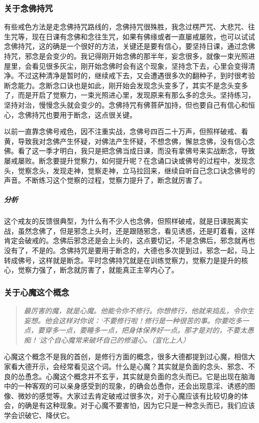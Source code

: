 \subsubsection{关于念佛持咒}

有些戒色方法是走念佛持咒路线的，念佛持咒很殊胜，我念过楞严咒、大悲咒、往生咒等，现在日课有念佛和念往生咒，如果有佛缘或者一直屡戒屡败，也可以试试念佛持咒，这的确是一个很好的方法，关键还是要有信心，要坚持日课，通过念佛持咒，邪念是会变少的。我记得刚开始念佛的那半年，妄念很多，就像一束光照进屋里，会看见很多灰尘，刚开始念佛时会有这个现象，坚持念下去，心里会变得清净。不过这种清净是暂时的，继续戒下去，又会遭遇很多次的翻种子，到时很考验断念能力。念断念口诀也是如此，刚开始会发现念头变多了，其实不是念头变多了，而是开启了觉察力，一束光照进心里，发现原来有那么多的念头。坚持练习，坚持对治，慢慢念头就会变少的。念佛持咒有佛菩萨加持，但也要自己有信心和恒心，念佛持咒也要用于断念，这点很关键。

\begin{case}
    以前一直靠念佛号戒色，因不注重实战，念佛号四百二十万声，但照样破戒、看黄，导致我对念佛产生怀疑，对佛法产生怀疑，不想念佛，懈怠念佛，没有信心念佛。看了这一季才明白，我只是把念佛当成日课，而没有拿佛号来实战断念，导致屡戒屡败。断念要提升觉察力，如何提升呢？在念诵口诀或佛号的过程中，发现念头，觉察念头，发现走神，觉察走神，立马拉回来，继续自听自己念口诀念佛号的声音。不断练习这个觉察的过程，觉察力提升了，断念就厉害了。
    \subparagraph{分析} 这个戒友的反馈很典型，为什么有不少人也念佛，但照样破戒，就是日课脱离实战，虽然念佛了，但是邪念上头时，还是跟随邪念，看见诱惑，还是盯着看，这样肯定会破戒的。念佛后邪念还是会上头的，这点要切记，不是念佛后，邪念就再也没有了，不是的。念佛持咒是要用于断念的，大德也多次提到过，邪念一起，马上转成佛号，这样就是断念。平时念佛持咒就是在训练觉察力，觉察力是提升的核心，觉察力强了，断念就厉害了，就能真正主宰内心了。
\end{case}

\subsubsection{关于心魔这个概念}

\begin{quote}\it
    最厉害的魔，就是心魔。他能令你不修行。你想修行，他就来捣乱，令你生妄想。他会这样对你说：‘不要修行啦！修行是一种很苦的事。你要吃多一点，要穿多一点，要睡多一点，把身体保养好一点。那才是对的，不要太愚痴！’这个自心魔常来破坏自己的修道心。（宣化上人）
\end{quote}

心魔这个概念不是我的首创，是修行方面的概念，很多大德都提到过心魔，相信大家看大德开示，会经常看见这个词。什么是心魔？其实就是负面的念头、邪念、不良的怂恿念。心魔这个概念并不玄乎，其实就是负面的念头而已。它是出现在脑海中的一种客观的可以亲身感受到的现象，的确会怂恿你，还会出现意淫、诱惑的图像、微妙的感觉等。大家过去肯定破戒过很多次，对于心魔应该有比较切身的体会，的确是有这种现象。对于心魔不要害怕，因为它只是一种念头而已，我们应该学会识破它、降伏它。

